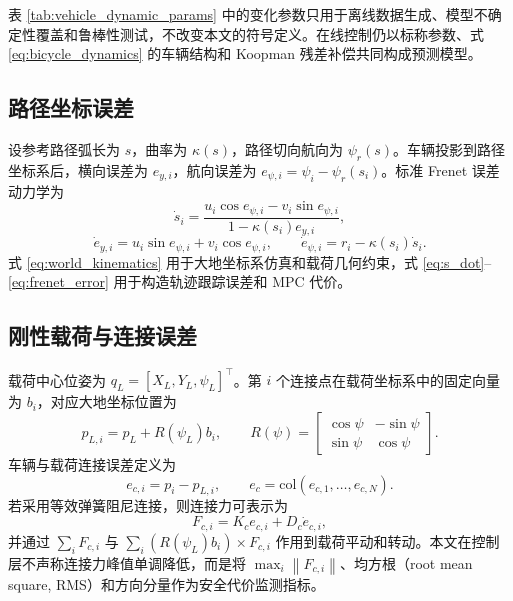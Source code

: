 \documentclass[twocolumn,3p,times,procedia]{elsarticle}
\newcommand{\norm}[1]{\left\lVert #1 \right\rVert}
\begin{document}
表 \ref{tab:vehicle_dynamic_params} 中的变化参数只用于离线数据生成、模型不确定性覆盖和鲁棒性测试，不改变本文的符号定义。在线控制仍以标称参数、式 \eqref{eq:bicycle_dynamics} 的车辆结构和 Koopman 残差补偿共同构成预测模型。

\subsection{路径坐标误差}

设参考路径弧长为 $s$，曲率为 $\kappa(s)$，路径切向航向为 $\psi_r(s)$。车辆投影到路径坐标系后，横向误差为 $e_{y,i}$，航向误差为 $e_{\psi,i}=\psi_i-\psi_r(s_i)$。标准 Frenet 误差动力学为
\begin{equation}
\dot s_i=\frac{u_i\cos e_{\psi,i}-v_i\sin e_{\psi,i}}
{1-\kappa(s_i)e_{y,i}},
\label{eq:s_dot}
\end{equation}
\begin{equation}
\dot e_{y,i}=u_i\sin e_{\psi,i}+v_i\cos e_{\psi,i},\qquad
\dot e_{\psi,i}=r_i-\kappa(s_i)\dot s_i .
\label{eq:frenet_error}
\end{equation}
式 \eqref{eq:world_kinematics} 用于大地坐标系仿真和载荷几何约束，式 \eqref{eq:s_dot}--\eqref{eq:frenet_error} 用于构造轨迹跟踪误差和 MPC 代价。

\subsection{刚性载荷与连接误差}

载荷中心位姿为 $q_L=[X_L,Y_L,\psi_L]^\top$。第 $i$ 个连接点在载荷坐标系中的固定向量为 $b_i$，对应大地坐标位置为
\begin{equation}
p_{L,i}=p_L+R(\psi_L)b_i,\qquad
R(\psi)=\begin{bmatrix}\cos\psi&-\sin\psi\\ \sin\psi&\cos\psi\end{bmatrix}.
\label{eq:payload_anchor}
\end{equation}
车辆与载荷连接误差定义为
\begin{equation}
e_{c,i}=p_i-p_{L,i},\qquad
e_c=\mathrm{col}(e_{c,1},\ldots,e_{c,N}).
\label{eq:connection_error}
\end{equation}
若采用等效弹簧阻尼连接，则连接力可表示为
\begin{equation}
F_{c,i}=K_c e_{c,i}+D_c\dot e_{c,i},
\label{eq:connection_force}
\end{equation}
并通过 $\sum_i F_{c,i}$ 与 $\sum_i (R(\psi_L)b_i)\times F_{c,i}$ 作用到载荷平动和转动。本文在控制层不声称连接力峰值单调降低，而是将 $\max_i\norm{F_{c,i}}$、均方根（root mean square, RMS）和方向分量作为安全代价监测指标。
\end{document}
